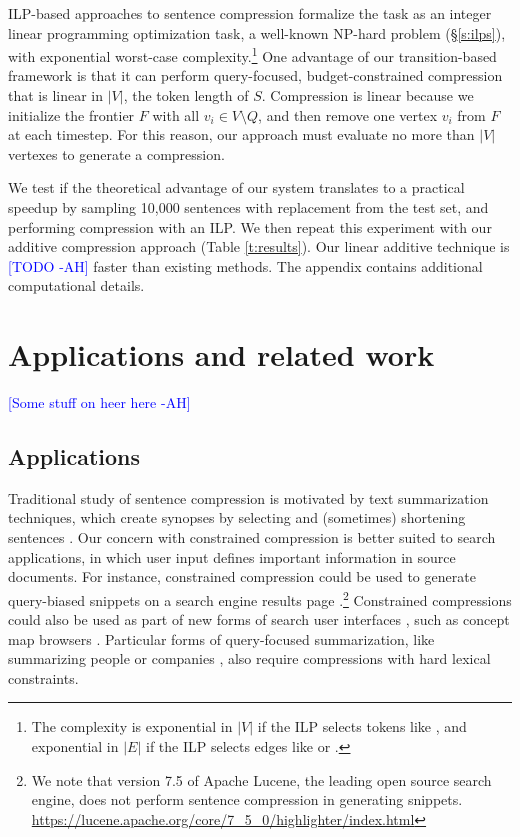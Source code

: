 \documentclass[11pt,a4paper]{article}
\newcommand{\ahcomment}[1]{\textcolor{blue}{[#1 -AH]}}
\begin{document}
ILP-based approaches to sentence compression formalize the task as an integer linear programming optimization task, a well-known NP-hard problem  (\S\ref{s:ilps}), with exponential worst-case complexity.\footnote{The complexity is exponential in $|V|$ if the ILP selects tokens like \citet{clarke2008global}, and exponential in $|E|$ if the ILP selects edges like \citet{filippova2008dependency} or \citet{filippova2013overcoming}.} One advantage of our transition-based framework is that it can perform query-focused, budget-constrained compression that is linear in $|V|$, the token length of $S$. Compression is linear because we initialize the frontier $F$ with all $v_i \in V \setminus Q$, and then remove one vertex $v_i$ from $F$ at each timestep. For this reason, our approach must evaluate no more than $|V|$ vertexes to generate a compression. 

We test if the theoretical advantage of our system translates to a practical speedup by sampling 10,000 sentences with replacement from the test set, and performing compression with an ILP. We then repeat this experiment with our additive compression approach (Table \ref{t:results}). Our linear additive technique is \ahcomment{TODO} faster than existing methods. The appendix contains additional computational details.

\section{Applications and related work}

\ahcomment{Some stuff on heer here}

\subsection{Applications}

Traditional study of sentence compression is motivated by text summarization techniques, which create synopses by selecting and (sometimes) shortening sentences \cite{Knight2000StatisticsBasedS,vanderwende2007beyond,martins2009summarization}.  Our concern with constrained compression is better suited to search applications, in which user input defines important information in source documents. For instance, constrained compression could be used to generate query-biased snippets on a search engine results page \cite{tombros1998advantages,Metzler2008MachineLS,kanungo2009predicting}.\footnote{We note that version 7.5 of Apache Lucene, the leading open source search engine, does not perform sentence compression in generating snippets. \url{https://lucene.apache.org/core/7_5_0/highlighter/index.html}} Constrained compressions could also be used as part of new forms of search user interfaces \cite{hearst2009search}, such as concept map browsers \cite{falke2017graphdocexplore}. Particular forms of query-focused summarization, like summarizing people \cite{w04} or companies \cite{filippova2009company}, also require compressions with hard lexical constraints. 
\end{document}
